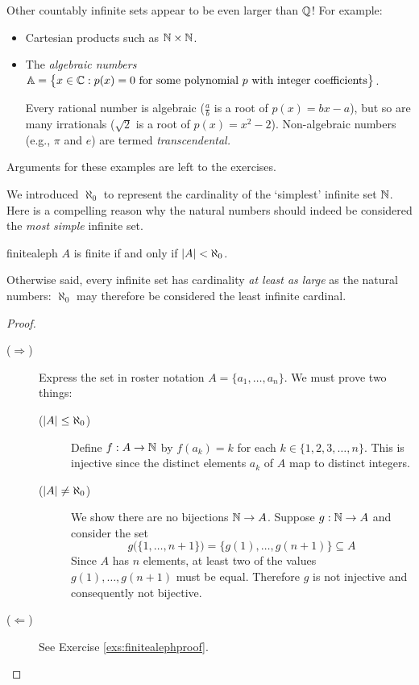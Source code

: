\goodbreak


Other countably infinite sets appear to be even larger than $\mathbb{Q}$! For example:
\begin{itemize}
  \item Cartesian products such as $\mathbb{N}\times\mathbb{N}$.
  \item The \emph{algebraic numbers} $\mathbb{A}=\bigl\{x\in\mathbb{C}:p(x)=0\text{ for some polynomial $p$ with integer coefficients}\bigr\}$.\par
  Every rational number is algebraic ($\frac ab$ is a root of $p(x)=bx-a$), but so are many irrationals ($\sqrt 2$ is a root of $p(x)=x^2-2$). Non-algebraic numbers (e.g., $\pi$ and $e$) are termed \emph{transcendental.}
\end{itemize}

Arguments for these examples are left to the exercises.



We introduced $\aleph_0$ to represent the cardinality of the `simplest' infinite set $\mathbb{N}$. Here is a compelling reason why the natural numbers should indeed be considered the \emph{most simple} infinite set.

\begin{thm}{}{finitealeph}
	$A$ is finite if and only if $\left| A\right|<\aleph_0$.
\end{thm}

Otherwise said, every infinite set has cardinality \emph{at least as large} as the natural numbers: $\aleph_0$ may therefore be considered the least infinite cardinal.

\begin{proof}
	\begin{description}
		\item[\normalfont ($\Rightarrow$)]
		Express the set in roster notation $A=\{a_1,\ldots,a_n\}$. We must prove two things:\footnotemark{}
		\begin{description}
			\item[\normalfont($\left| A\right|\le\aleph_0$)] Define $f:A\to\mathbb{N}$ by $f(a_k)=k$ for each $k\in\{1,2,3,\ldots,n\}$. This is injective since the distinct elements $a_k$ of $A$ map to distinct integers.
			\item[\normalfont($\left| A\right|\neq\aleph_0$)] We show there are no bijections $\mathbb{N}\to A$. Suppose $g:\mathbb{N}\to A$ and consider the set
			\[
				g\bigl(\{1,\ldots,n+1\}\bigr)=\bigl\{g(1),\ldots,g(n+1)\bigr\}\subseteq A
			\]
			Since $A$ has $n$ elements, at least two of the values $g(1),\ldots,g(n+1)$ must be equal. Therefore $g$ is not injective and consequently not bijective.
		\end{description}
		\item[\normalfont ($\Leftarrow$)] See Exercise \ref{exs:finitealephproof}. \qedhere
	\end{description} 
\end{proof}

